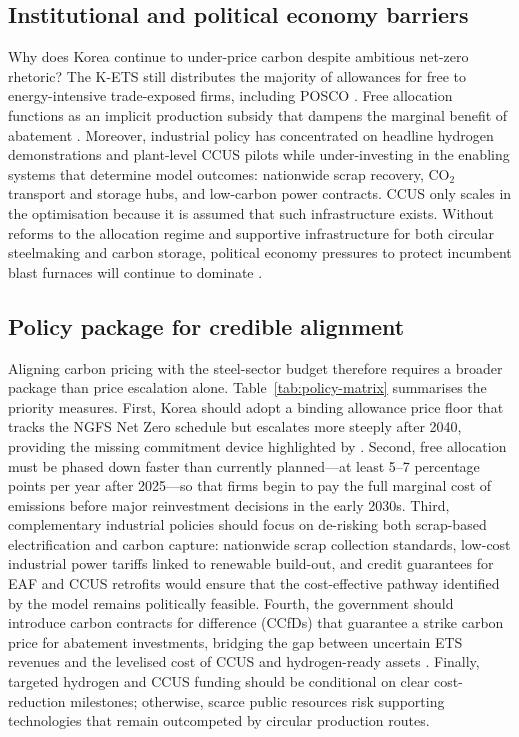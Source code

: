 \documentclass[preprint,1p,authoryear]{elsarticle}
\begin{document}
\subsection{Institutional and political economy barriers}

Why does Korea continue to under-price carbon despite ambitious net-zero rhetoric? The K-ETS still distributes the majority of allowances for free to energy-intensive trade-exposed firms, including POSCO \citep{kim2021kets, ICAP2024}. Free allocation functions as an implicit production subsidy that dampens the marginal benefit of abatement \citep{sartor2012benchmark}. Moreover, industrial policy has concentrated on headline hydrogen demonstrations and plant-level CCUS pilots while under-investing in the enabling systems that determine model outcomes: nationwide scrap recovery, CO$_2$ transport and storage hubs, and low-carbon power contracts. CCUS only scales in the optimisation because it is assumed that such infrastructure exists. Without reforms to the allocation regime and supportive infrastructure for both circular steelmaking and carbon storage, political economy pressures to protect incumbent blast furnaces will continue to dominate \citep{MaterialEconomics2019}.

\subsection{Policy package for credible alignment}

Aligning carbon pricing with the steel-sector budget therefore requires a broader package than price escalation alone. Table~\ref{tab:policy-matrix} summarises the priority measures. First, Korea should adopt a binding allowance price floor that tracks the NGFS Net Zero schedule but escalates more steeply after 2040, providing the missing commitment device highlighted by \citet{fowlie2016carbon}. Second, free allocation must be phased down faster than currently planned—at least 5--7 percentage points per year after 2025—so that firms begin to pay the full marginal cost of emissions before major reinvestment decisions in the early 2030s. Third, complementary industrial policies should focus on de-risking both scrap-based electrification and carbon capture: nationwide scrap collection standards, low-cost industrial power tariffs linked to renewable build-out, and credit guarantees for EAF and CCUS retrofits would ensure that the cost-effective pathway identified by the model remains politically feasible. Fourth, the government should introduce carbon contracts for difference (CCfDs) that guarantee a strike carbon price for abatement investments, bridging the gap between uncertain ETS revenues and the levelised cost of CCUS and hydrogen-ready assets \citep{Neuhoff2019CCfD,Richstein2017CCfD}. Finally, targeted hydrogen and CCUS funding should be conditional on clear cost-reduction milestones; otherwise, scarce public resources risk supporting technologies that remain outcompeted by circular production routes.
\end{document}
